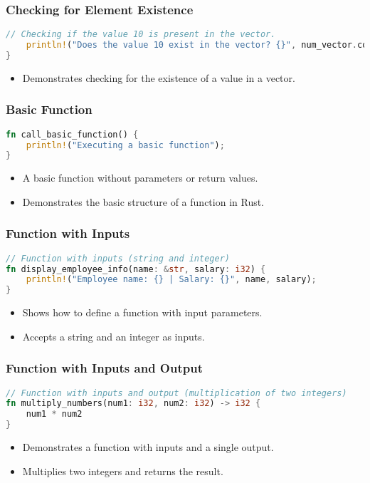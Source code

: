 \documentclass[aspectratio=169, table]{beamer}
\begin{document}
\begin{frame}[fragile]
\frametitle{Checking for Element Existence}
\begin{lstlisting}[language=Rust]
	// Checking if the value 10 is present in the vector.
	println!("Does the value 10 exist in the vector? {}", num_vector.contains(&10));
}
\end{lstlisting}
\begin{itemize}
\item Demonstrates checking for the existence of a value in a vector.
\end{itemize}
\end{frame}


\begin{frame}[fragile]
\frametitle{Basic Function}
\begin{lstlisting}[language=Rust]
fn call_basic_function() {
	println!("Executing a basic function");
}
\end{lstlisting}
\begin{itemize}
\item A basic function without parameters or return values.
\item Demonstrates the basic structure of a function in Rust.
\end{itemize}
\end{frame}

\begin{frame}[fragile]
\frametitle{Function with Inputs}
\begin{lstlisting}[language=Rust]
// Function with inputs (string and integer)
fn display_employee_info(name: &str, salary: i32) {
	println!("Employee name: {} | Salary: {}", name, salary);
}
\end{lstlisting}
\begin{itemize}
\item Shows how to define a function with input parameters.
\item Accepts a string and an integer as inputs.
\end{itemize}
\end{frame}

\begin{frame}[fragile]
\frametitle{Function with Inputs and Output}
\begin{lstlisting}[language=Rust]
// Function with inputs and output (multiplication of two integers)
fn multiply_numbers(num1: i32, num2: i32) -> i32 {
	num1 * num2
}
\end{lstlisting}
\begin{itemize}
\item Demonstrates a function with inputs and a single output.
\item Multiplies two integers and returns the result.
\end{itemize}
\end{frame}
\end{document}
